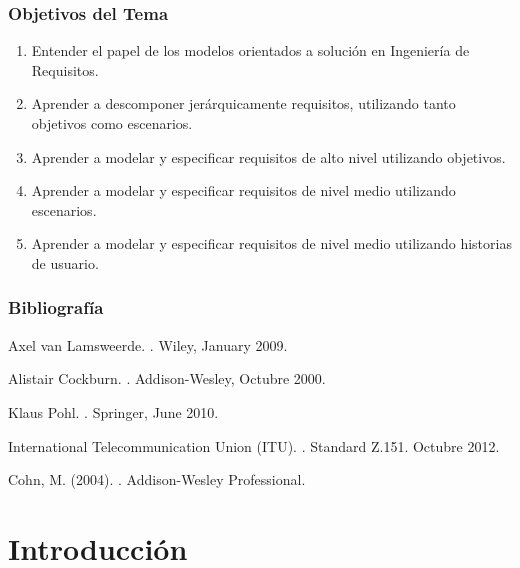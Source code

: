 \documentclass[slidestop,xcolor=pst,dvips,blue]{beamer}
\begin{document}
\begin{frame}[c]
    \frametitle{Objetivos del Tema}
    \begin{enumerate}[<+->]
         \item Entender el papel de los modelos orientados a solución en Ingeniería de Requisitos.
         \item Aprender a descomponer jerárquicamente requisitos, utilizando tanto objetivos como escenarios.
         \item Aprender a modelar y especificar requisitos de alto nivel utilizando objetivos.
         \item Aprender a modelar y especificar requisitos de nivel medio utilizando escenarios.
         \item Aprender a modelar y especificar requisitos de nivel medio utilizando historias de usuario.
    \end{enumerate}
\end{frame}

\begin{frame}[allowframebreaks,t]
    \frametitle{Bibliografía}
    \begin{thebibliography}{1}
Axel van Lamsweerde.
.
\newblock Wiley, January 2009.

Alistair Cockburn.
.
\newblock Addison-Wesley, Octubre 2000.

Klaus Pohl.
.
\newblock Springer, June 2010.

International Telecommunication Union (ITU).
.
\newblock Standard Z.151. Octubre 2012.

Cohn, M. (2004).
.
\newblock Addison-Wesley Professional.
\end{thebibliography}
\end{frame}

\section{Introducción}
\end{document}
